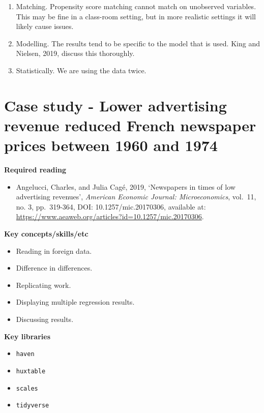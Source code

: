 \documentclass[
]{book}
\providecommand{\tightlist}{%
  \setlength{\itemsep}{0pt}\setlength{\parskip}{0pt}}
\begin{document}
\begin{enumerate}
\def\labelenumi{\arabic{enumi}.}
\tightlist
\item
  Matching. Propensity score matching cannot match on unobserved variables. This may be fine in a class-room setting, but in more realistic settings it will likely cause issues.
\item
  Modelling. The results tend to be specific to the model that is used. King and Nielsen, 2019, discuss this thoroughly.
\item
  Statistically. We are using the data twice.
\end{enumerate}

\hypertarget{case-study---lower-advertising-revenue-reduced-french-newspaper-prices-between-1960-and-1974}{%
\section{Case study - Lower advertising revenue reduced French newspaper prices between 1960 and 1974}\label{case-study---lower-advertising-revenue-reduced-french-newspaper-prices-between-1960-and-1974}}

\textbf{Required reading}

\begin{itemize}
\tightlist
\item
  Angelucci, Charles, and Julia Cagé, 2019, `Newspapers in times of low advertising revenues', \emph{American Economic Journal: Microeconomics}, vol.~11, no. 3, pp.~319-364, DOI: 10.1257/mic.20170306, available at: \url{https://www.aeaweb.org/articles?id=10.1257/mic.20170306}.
\end{itemize}

\textbf{Key concepts/skills/etc}

\begin{itemize}
\tightlist
\item
  Reading in foreign data.
\item
  Difference in differences.
\item
  Replicating work.
\item
  Displaying multiple regression results.
\item
  Discussing results.
\end{itemize}

\textbf{Key libraries}

\begin{itemize}
\tightlist
\item
  \texttt{haven}
\item
  \texttt{huxtable}
\item
  \texttt{scales}
\item
  \texttt{tidyverse}
\end{itemize}
\end{document}
